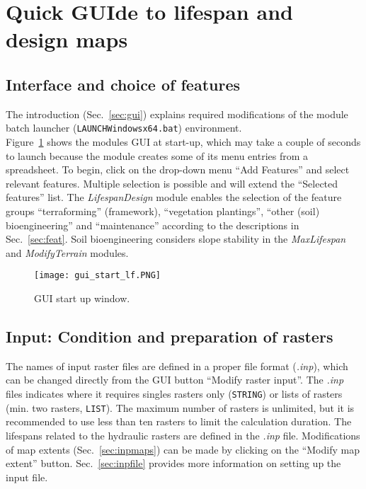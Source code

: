 \section{Quick GUIde to lifespan and design maps} \label{sec:lfgui}
\subsection{Interface and choice of features}
The introduction (Sec.~\ref{sec:gui}) explains required modifications of the module batch launcher (\texttt{LAUNCH{\myUnderscore}Windows{\myUnderscore}x64.bat}) environment.\\
Figure~\ref{fig:gui_start_lf} shows the modules GUI at start-up, which may take a couple of seconds to launch because the module creates some of its menu entries from a spreadsheet. To begin, click on the drop-down menu ``Add Features'' and select relevant features. Multiple selection is possible and will extend the ``Selected features'' list. The \textit{LifespanDesign} module enables the selection of the feature groups ``terraforming'' (framework), ``vegetation plantings'', ``other (soil) bioengineering'' and ``maintenance'' according to the descriptions in Sec.~\ref{sec:feat}. Soil bioengineering considers slope stability in the \textit{MaxLifespan} and \textit{ModifyTerrain} modules.
\begin{figure}[hbt]
	\begin{center}
	\texttt{[image: gui\_start\_lf.PNG]} %
	\caption{GUI start up window. \label{fig:gui_start_lf}}
	\end{center}
\end{figure}



\subsection{Input: Condition and preparation of rasters}\label{sec:inpras}
The names of input raster files are defined in a proper file format (\textit{.inp}), which can be changed directly from the GUI button ``Modify raster input''. The \textit{.inp} files indicates where it requires singles rasters only (\texttt{STRING}) or lists of rasters (min. two rasters, \texttt{LIST}). The maximum number of rasters is unlimited, but it is recommended to use less than ten rasters to limit the calculation duration. The lifespans related to the hydraulic rasters are defined in the \textit{.inp} file. Modifications of map extents (Sec.~\ref{sec:inpmaps}) can be made by clicking on the ``Modify map extent'' button. Sec.~\ref{sec:inpfile} provides more information on setting up the input file.


